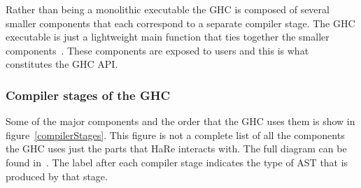 Rather than being a monolithic executable the GHC is composed of several smaller components that each correspond to a separate compiler stage. The GHC executable is just a lightweight main function that ties together the smaller components~\citep{ghcDesign}. These components are exposed to users  and this is what constitutes the GHC API.

\subsubsection{Compiler stages of the GHC}\label{ghcStages}

Some of the major components and the order that the GHC uses them is show in figure~\ref{compilerStages}. This figure is not a complete list of all the components the GHC uses just the parts that HaRe interacts with. The full diagram can be found in~\citep{ghcDesign}. The label after each compiler stage indicates the type of AST that is produced by that stage.

